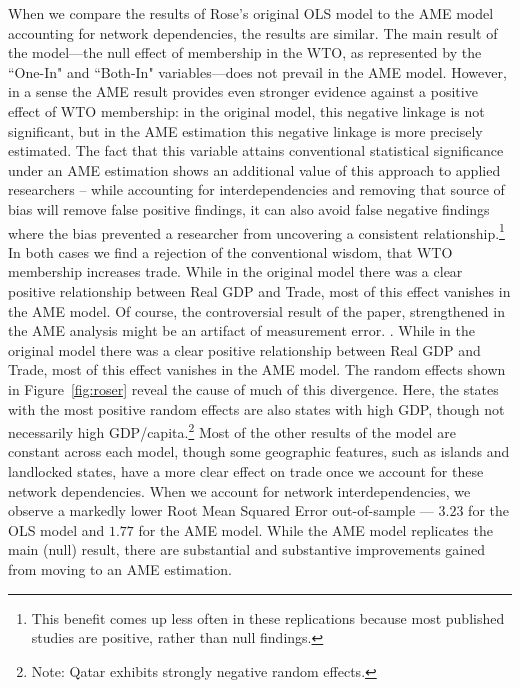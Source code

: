 When we compare the results of Rose's original OLS model to the AME model accounting for network dependencies, the results are similar. The main result of the model---the null effect of membership in the WTO, as represented by the ``One-In" and ``Both-In" variables---does not prevail in the AME model. However, in a sense the AME result provides even stronger evidence against a positive effect of WTO membership: in the original model, this negative linkage is not significant, but in the AME estimation this negative linkage is more precisely estimated. The fact that this variable attains conventional statistical significance under an AME estimation shows an additional value of this approach to applied researchers -- while accounting for interdependencies and removing that source of bias will remove false positive findings, it can also avoid false negative findings where the bias prevented a researcher from uncovering a consistent relationship.\footnote{This benefit comes up less often in these replications because most published studies are positive, rather than null findings.} In both cases we find  a rejection of the conventional wisdom, that WTO membership increases trade. While in the original model there was a clear positive relationship between Real GDP and Trade, most of this effect vanishes in the AME model. Of course, the controversial result of the paper, strengthened in the AME analysis might be an artifact of measurement error. \citep{tomz:etal:2007}. While in the original model there was a clear positive relationship between Real GDP and Trade, most of this effect vanishes in the AME model. The random effects shown in Figure~\ref{fig:roser} reveal the cause of much of this divergence. Here, the states with the most positive random effects are also states with high GDP, though not necessarily high GDP/capita.\footnote{Note: Qatar exhibits strongly negative random effects.}  Most of the other results of the model are constant across each model, though some geographic features, such as islands and landlocked states, have a more clear effect on trade once we account for these network dependencies. When we account for network interdependencies, we observe a markedly lower Root Mean Squared Error out-of-sample --- $3.23$ for the OLS model and $1.77$ for the AME model. While the AME model replicates the main (null) result, there are substantial and substantive improvements gained from moving to an AME estimation.

